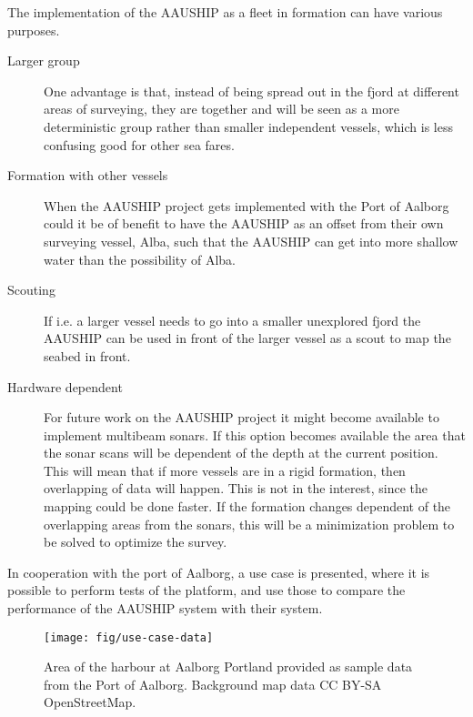 The implementation of the AAUSHIP as a fleet in formation can have various purposes.
\begin{description}
\item[Larger group] One advantage is that, instead of being spread out
	in the fjord at different areas of surveying, they are together and
	will be seen as a more deterministic group rather than smaller
	independent vessels, which is less confusing good for other sea fares.
\item[Formation with other vessels] When the AAUSHIP project gets implemented with the Port of Aalborg could it be of benefit to have the AAUSHIP as an offset from their own surveying vessel, Alba, such that the AAUSHIP can get into more shallow water than the possibility of Alba.
\item[Scouting] If i.e. a larger vessel needs to go into a smaller
	unexplored fjord the AAUSHIP can be used in front of the larger
	vessel as a scout to map the seabed in front.
\item[Hardware dependent] For future work on the AAUSHIP project it might become available to implement multibeam sonars. If this option becomes available the area that the sonar scans will be dependent of the depth at the current position. This will mean that if more vessels are in a rigid formation, then overlapping of data will happen. This is not in the interest, since the mapping could be done faster. If the formation changes dependent of the overlapping areas from the sonars, this will be a minimization problem to be solved to optimize the survey.
\end{description}

In cooperation with the port of Aalborg, a use case is presented, where it is possible to perform tests of the platform, and use those to compare the performance of the AAUSHIP system with their system.
\begin{figure}[htbp]
	\centering
	\texttt{[image: fig/use-case-data]}
	\caption{Area of the harbour at Aalborg Portland provided as sample
	data from the Port of Aalborg. Background map data CC BY-SA OpenStreetMap.}
	\label{fig:diffforms}
\end{figure}

